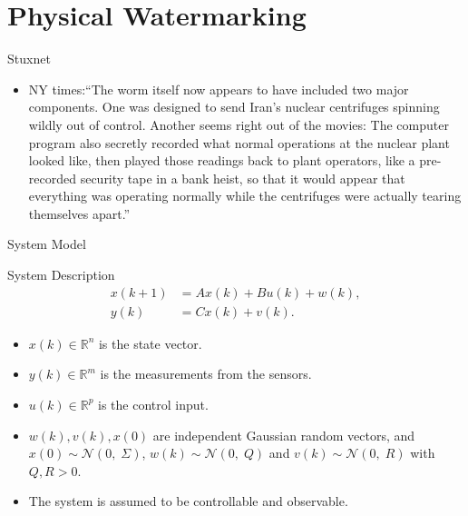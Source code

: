 \documentclass[10pt]{beamer}
\begin{document}
\section{Physical Watermarking}

\begin{frame}{Stuxnet}
  \begin{itemize}
    \item NY times:``The worm itself now appears to have included two major components. One was designed to send Iran's nuclear centrifuges spinning wildly out of control. Another seems right out of the movies: The computer program also \alert{secretly recorded what normal operations at the nuclear plant looked like, then played those readings back to plant operators}, like a pre-recorded security tape in a bank heist, so that it would appear that everything was operating normally while the centrifuges were actually tearing themselves apart.''
  \end{itemize}
\end{frame}

\begin{frame}{System Model}
  \begin{block}{System Description}
      \begin{displaymath}
	\begin{split}
	  x(k+1) &= Ax(k)  + Bu(k)+w(k),\\
	  y(k) &= C x(k) + v(k).
	\end{split}
      \end{displaymath}
    \end{block}
    \begin{itemize}
      \item $x(k) \in \mathbb R^n$ is the state vector.
      \item  $y(k) \in \mathbb R^m$ is the measurements from the sensors.
      \item  $u(k) \in \mathbb R^p$ is the control input.
      \item $w(k),v(k),x(0)$ are independent Gaussian random vectors, and $x(0) \sim \mathcal N(0,\;\Sigma)$, $w(k) \sim \mathcal N(0,\;Q)$ and $v(k) \sim \mathcal N(0,\;R)$ with $Q,R>0$.
      \item The system is assumed to be controllable and observable.
    \end{itemize}
  \end{frame}
\end{document}
